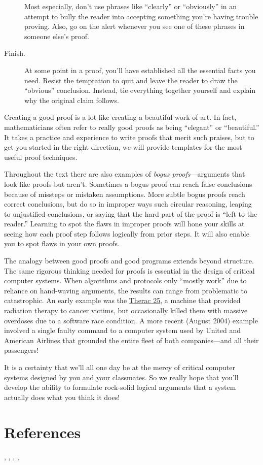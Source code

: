 \begin{description}
  Most especially, don't use phrases like ``clearly'' or ``obviously'' in
  an attempt to bully the reader into accepting something you're having
  trouble proving.  Also, go on the alert whenever you see one of these
  phrases in someone else's proof.

\item[Finish.]  At some point in a proof, you'll have established all the
essential facts you need.  Resist the temptation to quit and leave the
reader to draw the ``obvious'' conclusion.  Instead, tie everything
together yourself and explain why the original claim follows.

\end{description}

Creating a good proof is a lot like creating a beautiful work of art.  In
fact, mathematicians often refer to really good proofs as being
``elegant'' or ``beautiful.''  It takes a practice and experience to write
proofs that merit such praises, but to get you started in
the right direction, we will provide templates for the most useful proof
techniques.

Throughout the text there are also examples of \emph{bogus proofs}---arguments 
that look like proofs but aren't.  Sometimes a bogus
proof can reach false conclusions because of missteps or mistaken
assumptions.  More subtle bogus proofs reach correct conclusions, but
do so in improper ways such circular reasoning, leaping to
unjustified conclusions, or saying that the hard part of the
proof is ``left to the reader.''  Learning to spot the flaws in improper
proofs will hone your skills at seeing how each proof step follows
logically from prior steps.  It will also enable you to spot flaws in
your own proofs.

The analogy between good proofs and good programs extends beyond
structure.  The same rigorous thinking needed for proofs is essential in
the design of critical computer systems.  When algorithms and protocols
only ``mostly work'' due to reliance on hand-waving arguments, the results
can range from problematic to catastrophic.  An early example was the
\href{http://sunnyday.mit.edu/papers/therac.pdf}{Therac 25}, 
a machine that provided radiation therapy to cancer victims,
but occasionally killed them with massive overdoses due to a software race
condition.  A more recent (August 2004) example involved a single faulty
command to a computer system used by United and American Airlines that
grounded the entire fleet of both companies---and all their passengers!

It is a certainty that we'll all one day be at the mercy of critical
computer systems designed by you and your classmates.  So we really
hope that you'll develop the ability to formulate rock-solid logical
arguments that a system actually does what you think it does!

\section{References}

\cite{Cupillari12}, \cite{AignerG99}, \cite{Velleman1994}, \cite{Fagin1995}, \cite{Gelfond34}

\endinput
